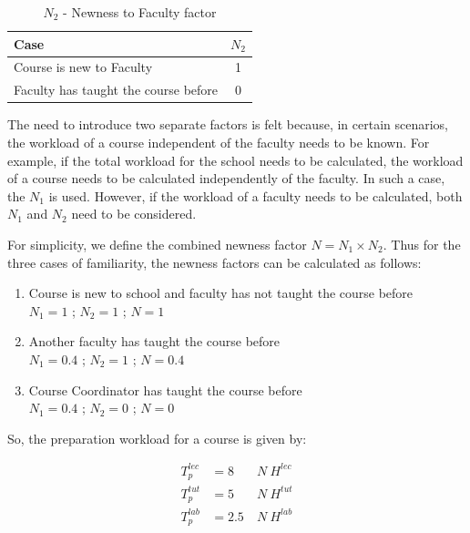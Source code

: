 \begin{table}[ht]
  \centering
  \begin{tabular}{|l|c|}
    \hline
    \textbf{Case}                        & \textbf{\(N_2\)} \\ \hline
    Course is new to Faculty             & 1                \\ \hline
    Faculty has taught the course before & 0                \\ \hline
  \end{tabular}
  \caption{\(N_2\) - Newness to Faculty factor}
  \label{tab:n2-workload-factor}
\end{table}

The need to introduce two separate factors is felt because, in certain scenarios, the workload of a course independent of the faculty needs to be known. For example, if the total workload for the school needs to be calculated, the workload of a course needs to be calculated independently of the faculty. In such a case, the \(N_1\) is used. However, if the workload of a faculty needs to be calculated, both \(N_1\) and \(N_2\) need to be considered.

For simplicity, we define the combined newness factor \(N = N_1 \times N_2\). Thus for the three cases of familiarity, the newness factors can be calculated as follows:

\begin{enumerate}
  \item Course is new to school and faculty has not taught the course before       \\
        \(N_1 = 1\) ; \(N_2 = 1\) ; \(N = 1\)
  \item Another faculty has taught the course before \\
        \(N_1 = 0.4\) ; \(N_2 = 1\) ; \(N = 0.4\)
  \item Course Coordinator has taught the course before     \\
        \(N_1 = 0.4\) ; \(N_2 = 0\) ; \(N = 0\)
\end{enumerate}

So, the preparation workload for a course is given by:

\begin{equation}
  \begin{aligned}
    T_p^{lec} & = 8   & \ N \ H^{lec} \\
    T_p^{tut} & = 5   & \ N \ H^{tut} \\
    T_p^{lab} & = 2.5 & \ N \ H^{lab}
  \end{aligned}
\end{equation}

